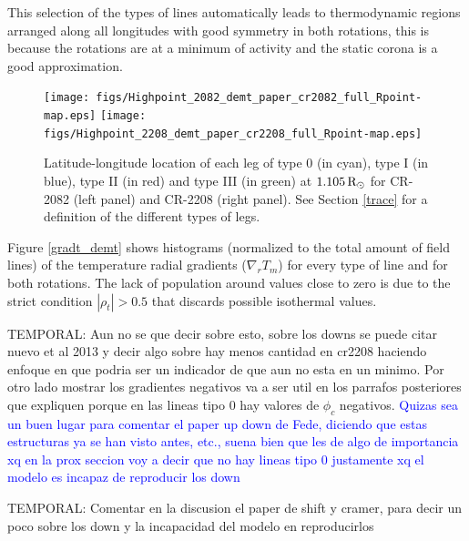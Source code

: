 \documentclass[namedreferences]{solarphysics}
\newcommand{\mrsun}{{\rm R_\odot}}
\def\temp#1{\textcolor{mygray}{TEMPORAL: #1}}
\begin{document}
\begin{article}
This selection of the types of lines automatically leads to thermodynamic regions arranged along all longitudes with good symmetry in both rotations, this is because the rotations are at a minimum of activity and the static corona is a good approximation.


\begin{figure}[h!]
\begin{center}
\texttt{[image: figs/Highpoint\_2082\_demt\_paper\_cr2082\_full\_Rpoint-map.eps]}
\texttt{[image: figs/Highpoint\_2208\_demt\_paper\_cr2208\_full\_Rpoint-map.eps]}
\caption{Latitude-longitude location of each leg of type 0 (in cyan), type I (in blue), type II (in red) and type III (in green) at $1.105\,\mrsun$ for CR-2082 (left panel) and CR-2208 (right panel). See Section \ref{trace} for a definition of the different types of legs.}
\label{rpoint_demt}
\end{center}
\end{figure} 

Figure \ref{gradt_demt} shows histograms (normalized to the total amount of field lines) of the temperature radial gradients ($\nabla_r T_m$) for every type of line and for both rotations.
The lack of population around values close to zero is due to the strict condition $|\rho_t| > 0.5$ that discards possible isothermal values.

\temp{Aun no se que decir sobre esto, sobre los downs se puede citar nuevo et al 2013 y decir algo sobre hay menos cantidad en cr2208 haciendo enfoque en que podria ser un indicador de que aun no esta en un minimo. Por otro lado mostrar los gradientes negativos va a ser util en los parrafos posteriores que expliquen porque en las lineas tipo 0 hay valores de $\phi_c$ negativos.} 
\textcolor{blue}{Quizas sea un buen lugar para comentar el paper up down de Fede, diciendo que estas estructuras ya se han visto antes, etc., suena bien que les de algo de importancia xq en la prox seccion voy a decir que no hay lineas tipo 0 justamente xq el modelo es incapaz de reproducir los down}

\temp{ Comentar en la discusion el paper de shift y cramer, para decir un poco sobre los down y la incapacidad del modelo en reproducirlos}



\end{article}
\end{document}
